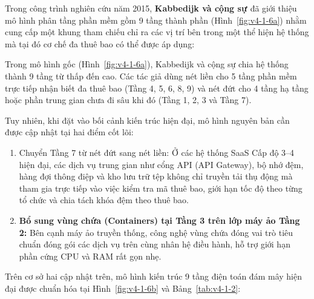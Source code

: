 Trong công trình nghiên cứu năm 2015, \textbf{Kabbedijk và cộng sự \cite{v4-05}} đã giới thiệu mô hình phân tầng phần mềm gồm 9 tầng thành phần (Hình~\ref{fig:v4-1-6a}) nhằm cung cấp một khung tham chiếu chỉ ra các vị trí bên trong một thể hiện hệ thống mà tại đó cơ chế đa thuê bao có thể được áp dụng:


Trong mô hình gốc (Hình~\ref{fig:v4-1-6a}), Kabbedijk và cộng sự chia hệ thống thành 9 tầng từ thấp đến cao. Các tác giả dùng nét liền cho 5 tầng phần mềm trực tiếp nhận biết đa thuê bao (Tầng 4, 5, 6, 8, 9) và nét đứt cho 4 tầng hạ tầng hoặc phần trung gian chưa đi sâu khi đó (Tầng 1, 2, 3 và Tầng 7).

Tuy nhiên, khi đặt vào bối cảnh kiến trúc hiện đại, mô hình nguyên bản cần được cập nhật tại hai điểm cốt lõi:

\begin{enumerate}
\def\labelenumi{\arabic{enumi}.}
\item
  Chuyển Tầng 7 từ nét đứt sang nét liền: Ở các hệ thống SaaS Cấp độ 3--4 hiện đại, các dịch vụ trung gian như cổng API (API Gateway), bộ nhớ đệm, hàng đợi thông điệp và kho lưu trữ tệp không chỉ truyền tải thụ động mà tham gia trực tiếp vào việc kiểm tra mã thuê bao, giới hạn tốc độ theo từng tổ chức và chia tách khóa đệm theo thuê bao.
\item
  \textbf{Bổ sung vùng chứa (Containers) tại Tầng 3 trên lớp máy ảo Tầng 2:} Bên cạnh máy ảo truyền thống, công nghệ vùng chứa đóng vai trò tiêu chuẩn đóng gói các dịch vụ trên cùng nhân hệ điều hành, hỗ trợ giới hạn phần cứng CPU và RAM rất gọn nhẹ.
\end{enumerate}

Trên cơ sở hai cập nhật trên, mô hình kiến trúc 9 tầng điện toán đám mây hiện đại được chuẩn hóa tại Hình~\ref{fig:v4-1-6b} và Bảng~\ref{tab:v4-1-2}:


